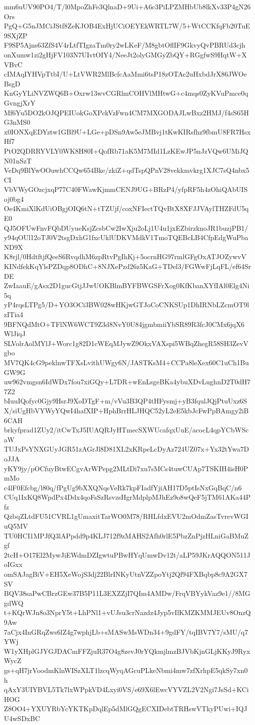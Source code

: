 mm6uUV90PO4/T/l0MpoZhFe3QlnaD+9Ui+A6c3PiLPZMHbUb8lkXv33P4gN26Ors
PgQ+G5nJMCiJStf8ZeKJOB4ExHjUCiOEYEkWRTL7W/5+WtCCKfqFb20TuE9SXjZP
F9SP5Ajns63ZfS4V4rLtfTIgzaTm0ry2wLKeF/M8gbtOflIF9GkvyQvPBRUd3cjh
onXumw1zi2gHjFV103N7UIvtOIY4/NeeJt2olyGMGyZbQY+RGgfwS9HqtW+XVBvC
cIMAqIYHVpTtbI/U+LtVWR2MlBcfcAaMmi6tsP18zOTAc2uHxbdJrX86JWOeBsgD
KnGyYLiNVZWQ6B+Oxrw13wvCGRlmCOHVlMHtwG+c4mqs0ZyKVuPmce0qGvngjXrY
Mf6Yu5DO2kOJQPEIUokGoXPckVzFwn4CM7MXGODAJLwBxz2HMJ/f4sS65HG3nMS0
x0IONXqEDYztw1GBl9U+LGe+pDSn9Aw5eJMBvj1tKwKIRsfhz9fbmU8FR7HsxHf7
PtO2QDRRYVLY0WK8H80I+QofRb71aK5M7MId1LzKEwJP5nJzVQw6UMiJQN01nSzT
VeDq9BlYwOOuwhCCQw654Bke/zkiZ+qdTspQPnV28vekkmvkrg1XJC7sQ4nbx5CI
VbVWyGOzcjxqP77C40FWawKjmmCENJ9UG+BRzP4/yfpRF5h4zOhiQAbUISoj0bg4
Oe4KmiXlKdUiOBgjOIQ6tN+tTZUjf/coxNFIectTQvBtX8XFJJVAylTHZFdU5qE0
QJ5OFUwFnvFQbDUyueKsjZcsbCw2IwXju2oLj1U4u1jxEZbirzknoJR1buzjPB1/
y94qOUl12oTJ0V2tsgDxhG1fxcUklUDKVMdkV1TmoTQEBcLB4CfpEdgWuPbaND9X
K8rjl/0HdtftjfQeeS6RvqdhM6zpRtvPgIhKj+5ocrnHG97rmlGFgOxATJOZywvV
KINdfekKqYlsPZDqp8ODhC+8NJXePzd26z5KaG+TDel3/FGWwFjLqFL/ef64SrDE
ZwIaauE/gAsx2D1gucGtjJJwUOKBlmBYFBWGSFrXog0KfKbanXYfIAl0Elg4Ni5q
yP4rqsLTPg5/D+YO3OCi3BW028wHKjwGTJoCoCNKSUp1DhIRNbLZcmOT9lzITia4
9BFNQdMtO+TFlNW6WCT9Z3d8NvY0U84jgmbmiiYbSR89R3fcJ0CMx6jqX6WlJiqJ
SLVolrAolMYlJ+Worc1g82D1cWEqMJywZ9OkxVAXspi5WBqZhegR58SH3ZevVgbo
MV7QK4cG9peklnwTFXsLvithUWgy6N/JASTKsM4+CCPa8leXex60C1uCh1BuGW9G
uw962vmgsn6IdWDx7fou7xiGQy+L7DR+wEnLsgeBKa4ybuXDvLughnD2T0dH77Z2
bIuuIQofyc0Gjy9HsrJ9XoDTgF+m/vVu3B3QP4tHFysmj+yB3fqulJQjPtuUxz6S
X/siUgHbVYWyYQwI4hafXIP+HphBrrHLJHQC52yL2eE5kbJcFwPpBAmgy2iB6CAH
brkyfprad1ZUy2/itCwTxJ5IUAQRJyHTmecSXWUcafqxUuE/acocL4qpYCbWScaW
TUJxPsYNXGUyJGR51zAGrJl8D81XL2xKRpeLcDyAz724UZ07x+Yx32tYwa7DoJJA
yKY9jy/pOCfuyBtwECgvArWPepg2MLtDi7xu7sMCs4tuwCUAp7TSKIH4isH0PmMo
c4lF0Efcbg/l80q/fPgUg9bXXQNqsVeRk7kpFIadfYjiAH17D5ptIsNxGqBqC/n6
CUq1IxKQ8WpdPx4Ddx4qoFsSzRsvzsHgrMdplpMJhEz9o8wQeF5jTM61AKa44Pfz
QzbqZLtdFU51CVRL1gUmaxitTarWO0M78/RHLfdxEVU2mOdmZasTvrevWGIuQ5MV
TU0HCI1MPJfQ3lAPpdd9p4KLJ712f9zMAHS2Afh0rlE5PbzZnPjzHLniGaBMuZgf
2tcH+O17El2MywJiEWdmDZIgwtuPBwHYqUmwDv12t/aLP59JKrAQQON511JoIGxx
omSAJagBiV+EH5XeWojS3dj22BlrINKyUtnVZZpoYtj2Qf94FXBqbp8c9A2GX7SV
BQV38saPwCBrzGEw37B5P11L3EXZZjI7QIm4AMDw/FrqVBYykVaz9e1//8MGgdWQ
t+KQrWJn8o3NprY5t+LhPNl1+vUJsu3crNazdz4Jyp5vIlKMZKMMJEUv8OnzQ9Aw
7aCjx4InGRqZws6lZ4g7wphjLb+sMASwMsWDn34+9gdFY/tqIBV7Y7/sMU/q7YWj
W1yXHplGJYGJDACmFFZjuR37O4g8zevJ0rYQkmjlmzBJVbKjnGLjKKyJ9RyxWycZ
gs+qH7jrVoodmKlnWISzXLT1lzcqWyqAGcuPLkeNbmi4mw7zfXrhpE5qkSy7xn0h
qAxY3UIYBVL5Tk7lxWPpkVD4Lxyi0VS/e69X6lEwcVYVZL2V2Ngi7JsSd+KCiHOG
Z8OO4+YXUYRbYcYKTKpDqlEp5dMlGQgECXIDebtTRHswVTkyPUwi+IQJU4wSDxBC
